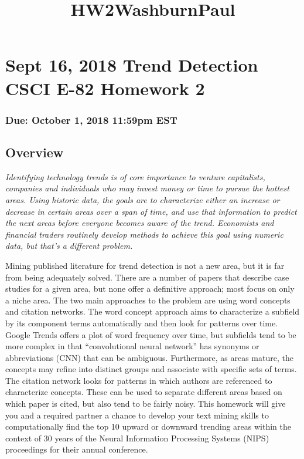 \documentclass[11pt]{article}
\title{HW2WashburnPaul}
\begin{document}
    
    
    \maketitle
    
    

    
    \section{Sept 16, 2018 Trend Detection CSCI E-82 Homework
2}\label{sept-16-2018-trend-detection-csci-e-82-homework-2}

\subsubsection{Due: October 1, 2018 11:59pm
EST}\label{due-october-1-2018-1159pm-est}

\subsection{Overview}\label{overview}

\emph{Identifying technology trends is of core importance to venture
capitalists, companies and individuals who may invest money or time to
pursue the hottest areas. Using historic data, the goals are to
characterize either an increase or decrease in certain areas over a span
of time, and use that information to predict the next areas before
everyone becomes aware of the trend. Economists and financial traders
routinely develop methods to achieve this goal using numeric data, but
that's a different problem.}

Mining published literature for trend detection is not a new area, but
it is far from being adequately solved. There are a number of papers
that describe case studies for a given area, but none offer a definitive
approach; most focus on only a niche area. The two main approaches to
the problem are using word concepts and citation networks. The word
concept approach aims to characterize a subfield by its component terms
automatically and then look for patterns over time. Google Trends offers
a plot of word frequency over time, but subfields tend to be more
complex in that ``convolutional neural network'' has synonyms or
abbreviations (CNN) that can be ambiguous. Furthermore, as areas mature,
the concepts may refine into distinct groups and associate with specific
sets of terms. The citation network looks for patterns in which authors
are referenced to characterize concepts. These can be used to separate
different areas based on which paper is cited, but also tend to be
fairly noisy. This homework will give you and a required partner a
chance to develop your text mining skills to computationally find the
top 10 upward or downward trending areas within the context of 30 years
of the Neural Information Processing Systems (NIPS) proceedings for
their annual conference.
\end{document}

